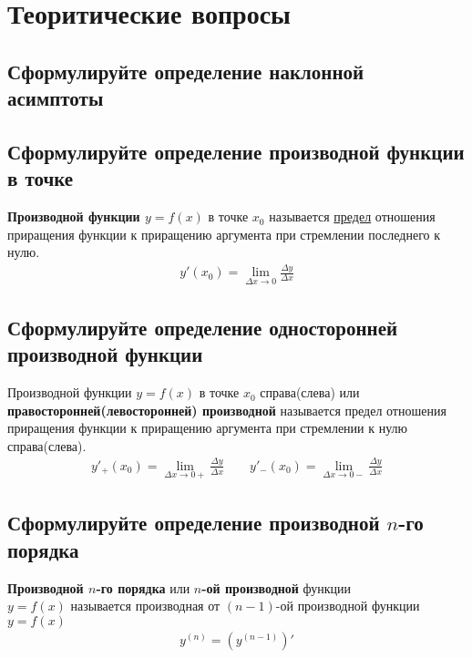 


\tableofcontents
\newpage
\section{Теоритические вопросы}
\subsection{Сформулируйте определение наклонной асимптоты}
\begin{definition}

\end{definition}
\subsection{Сформулируйте определение производной функции в точке}
\begin{definition}
\textbf{Производной функции $y = f(x)$} в точке $x_0$ называется \underline{предел} отношения приращения функции к приращению аргумента при стремлении последнего к нулю.
\begin{align*}
\boxed{y'(x_0) = \lim\limits_{\Delta x \to 0} \frac{\Delta y}{\Delta x}}
\end{align*}
\end{definition}

\subsection{Сформулируйте определение односторонней производной функции}
\begin{definition}
Производной функции $y=f(x)$ в точке $x_0$ справа(слева) или \textbf{правосторонней(левосторонней) производной} называется предел отношения приращения функции к приращению аргумента при стремлении к нулю справа(слева).
\begin{gather*}
\boxed{y'_+(x_0) = \lim\limits_{\Delta x \to 0+} \frac{\Delta y}{\Delta x}} \qquad \boxed{y'_-(x_0) = \lim\limits_{\Delta x \to 0-} \frac{\Delta y}{\Delta x}}
\end{gather*}
\end{definition}

\subsection{Сформулируйте определение производной $n$-го порядка}
\begin{definition}
\textbf{Производной $n$-го порядка} или \textbf{$n$-ой производной} функции \\ $y=f(x)$ называется производная от $(n-1)$-ой производной функции $y=f(x)$
\begin{align*}
\boxed{y^{(n)} = \left( y^{(n-1)} \right)'}
\end{align*}
\end{definition}


